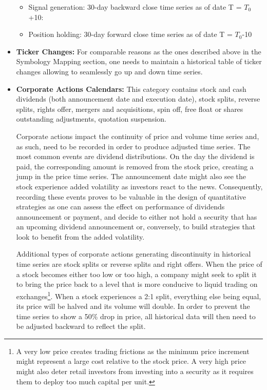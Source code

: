 \begin{itemize}
\begin{itemize}
\hspace*{-0.5cm}{\tt select close from data where date in [T-30,  T], sym=ABC}

\item Signal generation: 30-day backward close time series as of date T = $T_0$+10:

\hspace*{-0.5cm}{\tt select close from data where date in [$T_0$-20,  $T_0$+10], sym=EDF}

\item Position holding: 30-day forward close time series as of date T = $T_0$-10

\hspace*{-0.5cm}{\tt select close from data where date in [$T_0$-10,  $T_0$+20], sym=ABC}

\end{itemize}

\item \textbf{Ticker Changes:} For comparable reasons as the ones described above in the Symbology Mapping section, one needs to maintain a historical table of ticker changes allowing to seamlessly go up and down time series. 


\item \textbf{Corporate Actions Calendars:} This category contains stock and cash dividends (both announcement date and execution date), stock splits, reverse splits, rights offer, mergers and acquisitions, spin off, free float or shares outstanding adjustments, quotation suspension.


Corporate actions impact the continuity of price and volume time series and, as such, need to be recorded in order to produce adjusted time series. The most common events are dividend distributions. On the day the dividend is paid, the corresponding amount is removed from the stock price, creating a jump in the price time series. The announcement date might also see the stock experience added volatility as investors react to the news. Consequently, recording these events proves to be valuable in the design of quantitative strategies as one can assess the effect on performance of dividends announcement or payment, and decide to either not hold a security that has an upcoming dividend announcement or, conversely, to build strategies that look to benefit from the added volatility. 


Additional types of corporate actions generating discontinuity in historical time series are stock splits or reverse splits and right offers. When the price of a stock becomes either too low or too high, a company might seek to split it to bring the price back to a level that is more conducive to liquid trading on exchanges\footnote{A very low price creates trading frictions as the minimum price increment might represent a large cost relative to the stock price. A very high price might also deter retail investors from investing into a security as it requires them to deploy too much capital per unit.}. When a stock experiences a 2:1 split, everything else being equal, its price will be halved and its volume will double. In order to prevent the time series to show a 50\% drop in price, all historical data will then need to be adjusted backward to reflect the split.



\end{itemize}

